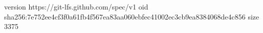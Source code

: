 version https://git-lfs.github.com/spec/v1
oid sha256:7e752ee4cf3f0a61fb4f567ea83aa060ebfec41002ec3cb9ea8384068de4c856
size 3375
